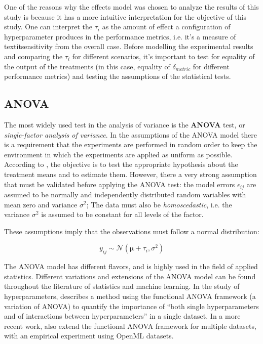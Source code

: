 One of the reasons why the effects model was chosen to analyze the results of this study is because it has a more intuitive interpretation for the objective of this study. One can interpret the $\tau_i$ as the amount of effect a configuration of hyperparameter produces in the performance metrics, i.e. it's a measure of textit{sensitivity} from the overall case. Before modelling the experimental results and comparing the $\tau_i$ for different scenarios, it's important to test for equality of the output of the treatments (in this case, equality of $\delta_{metric}$ for different performance metrics) and testing the assumptions of the statistical tests.

\subsection{ANOVA}

The most widely used test in the analysis of variance is the \textbf{ANOVA} test, or \textit{single-factor analysis of variance}. In the assumptions of the ANOVA model there is a requirement that the experiments are performed in random order to keep the environment in which the experiments are applied as uniform as possible. According to \cite{montgomery2017design}, the objective is to test the appropriate hypothesis about the treatment means and to estimate them. However, there a very strong assumption that must be validated before applying the ANOVA test: the model errors $\epsilon_{ij}$ are assumed to be normally and independently distributed random variables with mean zero and variance $\sigma^2$; The data must also be \textit{homoscedastic}, i.e. the variance $\sigma^2$ is assumed to be constant for all levels of the factor.

These assumptions imply that the observations must follow a normal distribution:

$$y_{ij} \sim \mathcal{N}(\bm{\mu} + \tau_i, \sigma^2)$$

The ANOVA model has different flavors, and is highly used in the field of applied statistics. Different variations and extensions of the ANOVA model can be found throughout the literature of statistics and machine learning. In the study of hyperparameters, \cite{hoos201x4efficient} describes a method using the functional ANOVA framework (a variation of ANOVA) to quantify the importance of ``both single hyperparameters and of interactions between hyperparameters'' in a single dataset. In a more recent work, \cite{van2017empirical} also extend the functional ANOVA framework for multiple datasets, with an empirical experiment using OpenML datasets.

